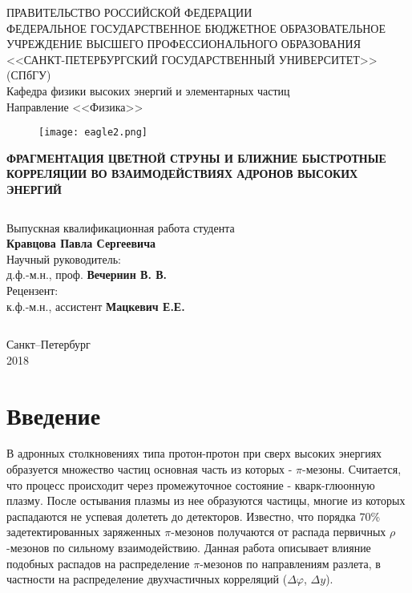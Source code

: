 \documentclass[12pt]{article}
\renewcommand{\phi}{\varphi}
\def\Dphi{\Delta\phi}
\def\Dy{\Delta y}
\begin{document}
\begin{center}
\large{ПРАВИТЕЛЬСТВО РОССИЙСКОЙ ФЕДЕРАЦИИ} \\
\vspace{2em}
\large{ФЕДЕРАЛЬНОЕ ГОСУДАРСТВЕННОЕ БЮДЖЕТНОЕ ОБРАЗОВАТЕЛЬНОЕ УЧРЕЖДЕНИЕ ВЫСШЕГО ПРОФЕССИОНАЛЬНОГО ОБРАЗОВАНИЯ \\
<<САНКТ-ПЕТЕРБУРГСКИЙ ГОСУДАРСТВЕННЫЙ УНИВЕРСИТЕТ>>\\
(СПбГУ)\\}
Кафедра физики высоких энергий и элементарных частиц\\
Направление <<Физика>>
\end{center}
\begin{figure}[h!]
\center
\texttt{[image: eagle2.png]}
\end{figure}

\begin{center}
\large{\bf ФРАГМЕНТАЦИЯ ЦВЕТНОЙ СТРУНЫ И БЛИЖНИЕ БЫСТРОТНЫЕ КОРРЕЛЯЦИИ ВО ВЗАИМОДЕЙСТВИЯХ АДРОНОВ ВЫСОКИХ ЭНЕРГИЙ}
\end{center}
$$$$
$$$$
\begin{flushright}
Выпускная квалификационная работа студента
$$$$
{\bf Кравцова Павла Сергеевича} \\
\vspace{2em}
Научный руководитель: \\
д.ф.-м.н., проф. {\bf Вечернин В. В.} \\
\vspace{2em}
Рецензент: \\
к.ф.-м.н., ассистент {\bf Мацкевич Е.Е.} \\
\end{flushright}
$$$$

\begin{center}
\Large{
Санкт--Петербург \\
2018}
\end{center}
\thispagestyle{empty}
\newpage

\tableofcontents
\newpage

\section{Введение}
\qquad В адронных столкновениях типа протон-протон при сверх высоких энергиях образуется множество частиц основная часть из которых - $\pi$-мезоны. Считается, что процесс происходит через промежуточное состояние - кварк-глюонную плазму. После остывания плазмы из нее образуются частицы, многие из которых распадаются не успевая долететь до детекторов.
Известно, что порядка 70\% задетектированных заряженных $\pi$-мезонов получаются от распада первичных $\rho$-мезонов по сильному взаимодействию. Данная работа описывает влияние подобных распадов на распределение $\pi$-мезонов по направлениям разлета, в частности на распределение двухчастичных корреляций ($\Dphi$, $\Dy$).
\end{document}
